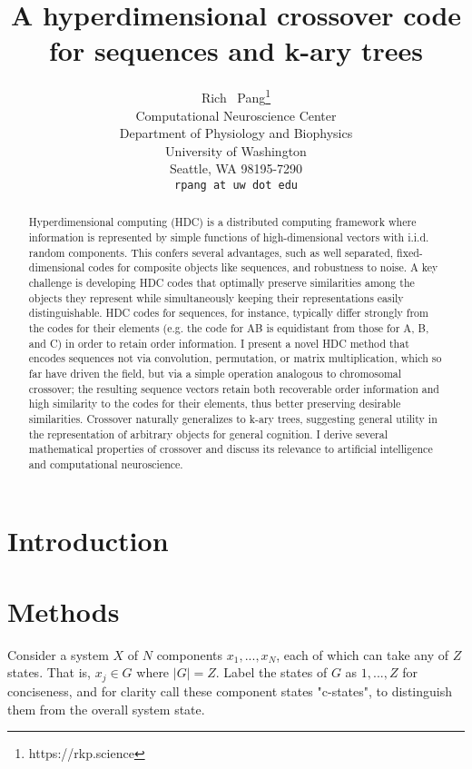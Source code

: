 \documentclass{article}
\title{A hyperdimensional crossover code for sequences and k-ary trees}
\author{
  Rich ~Pang\thanks{https://rkp.science} \\
  Computational Neuroscience Center\\
  Department of Physiology and Biophysics\\
  University of Washington\\
  Seattle, WA 98195-7290 \\
  \texttt{rpang at uw dot edu} \\
}
\begin{document}
\maketitle

\begin{abstract}
Hyperdimensional computing (HDC) is a distributed computing framework where information is represented by simple functions of high-dimensional vectors with i.i.d. random components. This confers several advantages, such as well separated, fixed-dimensional codes for composite objects like sequences, and robustness to noise. A key challenge is developing HDC codes that optimally preserve similarities among the objects they represent while simultaneously keeping their representations easily distinguishable. HDC codes for sequences, for instance, typically differ strongly from the codes for their elements (e.g. the code for AB is equidistant from those for A, B, and C) in order to retain order information. I present a novel HDC method that encodes sequences not via convolution, permutation, or matrix multiplication, which so far have driven the field, but via a simple operation analogous to chromosomal crossover; the resulting sequence vectors retain both recoverable order information and high similarity to the codes for their elements, thus better preserving desirable similarities. Crossover naturally generalizes to k-ary trees, suggesting general utility in the representation of arbitrary objects for general cognition. I derive several mathematical properties of crossover and discuss its relevance to artificial intelligence and computational neuroscience.
\end{abstract}




\section{Introduction}
\lipsum[2]
\lipsum[3]


\section{Methods}

Consider a system $X$ of $N$ components $x_1, ..., x_N$, each of which can take any of $Z$ states. That is, $x_j \in G$ where $|G| = Z$. Label the states of $G$ as $1,...,Z$ for conciseness, and for clarity call these component states "c-states", to distinguish them from the overall system state.
\end{document}
